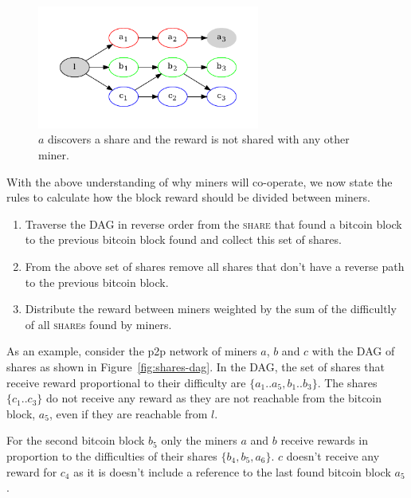 \documentclass{article}
\begin{document}
\begin{figure}
  \begin{center}
    \includegraphics[width=0.65\textwidth]{isolated-miners}
    \caption{$a$ discovers a share and the reward is not shared with any
      other miner.}\label{fig:isolated-miners}
  \end{center}    
\end{figure}

With the above understanding of why miners will co-operate, we now
state the rules to calculate how the block reward should be divided
between miners.

\begin{enumerate}
\item Traverse the DAG in reverse order from the \textsc{share} that
  found a bitcoin block to the previous bitcoin block found and
  collect this set of shares.
\item From the above set of shares remove all shares that don't have
  a reverse path to the previous bitcoin block.
\item Distribute the reward between miners weighted by the sum of
  the difficultly of all \textsc{share}s found by miners.
\end{enumerate}

As an example, consider the p2p network of miners $a$, $b$ and $c$
with the DAG of shares as shown in Figure~\ref{fig:shares-dag}. In the
DAG, the set of shares that receive reward proportional to their
difficulty are $\{a_1..a_5, b_1..b_3\}$. The shares $\{c_1..c_3\}$ do
not receive any reward as they are not reachable from the bitcoin
block, $a_5$, even if they are reachable from $l$.

For the second bitcoin block $b_5$ only the miners $a$ and $b$ receive
rewards in proportion to the difficulties of their shares
$\{b_4, b_5, a_6\}$. $c$ doesn't receive any reward for $c_4$ as it is
doesn't include a reference to the last found bitcoin block $a_5$.
\end{document}
